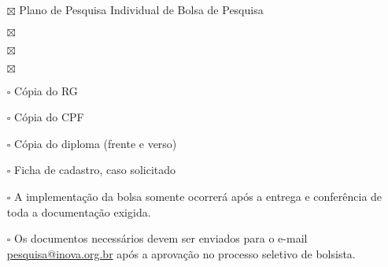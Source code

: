\clearpage
{}

\noindent{\large \textbf{\pesquisador}}

\begin{itemize}
    \item[$\boxtimes$] Plano de Pesquisa Individual de Bolsa de Pesquisa 
    \item[$\boxtimes$] 
    \item[$\boxtimes$] 
    \item[$\boxtimes$] 
\end{itemize}

\begin{itemize}
    \item[$\square$] Cópia do RG
    \item[$\square$] Cópia do CPF
    \item[$\square$] Cópia do diploma (frente e verso)
    \item[$\square$] Ficha de cadastro, caso solicitado
\end{itemize}

\begin{itemize}
    \item[$\square$] A implementação da bolsa somente ocorrerá após a entrega e conferência de toda a documentação exigida.
    \item[$\square$] Os documentos necessários devem ser enviados para o e-mail \href{mailto:pesquisa@inova.org.br}{pesquisa@inova.org.br} após a aprovação no processo seletivo de bolsista.
\end{itemize}

